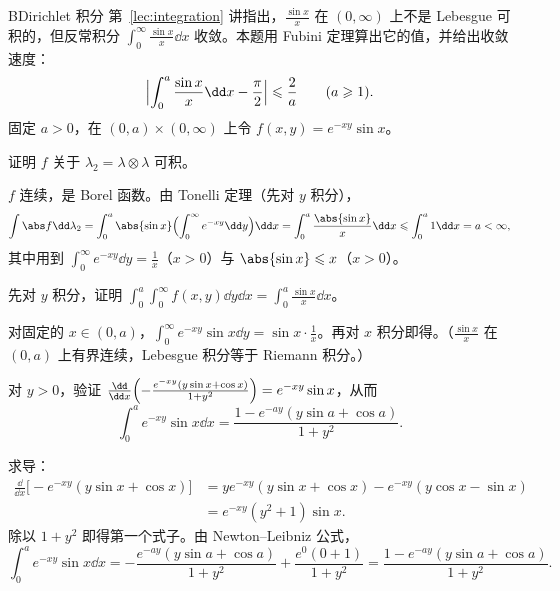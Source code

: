 \begin{probleme}{B}{Dirichlet 积分}
第~\ref{lec:integration} 讲指出，$\frac{\sin x}x$ 在 $(0,\infty)$ 上不是 Lebesgue 可积的，但反常积分 $\int_0^\infty\frac{\sin x}x\dd x$ 收敛。本题用 Fubini 定理算出它的值，并给出收敛速度：
\[
\Bigl\lvert\int_0^a\frac{\sin x}x\dd x-\frac\pi2\Bigr\rvert\leqslant\frac2a\qquad(a\geqslant1).
\]
固定 $a>0$，在 $(0,a)\times(0,\infty)$ 上令 $f(x,y)=e^{-xy}\sin x$。
\begin{questions}
\item 证明 $f$ 关于 $\lambda_2=\lambda\otimes\lambda$ 可积。
\begin{solution}
$f$ 连续，是 Borel 函数。由 Tonelli 定理（先对 $y$ 积分），
\[
\int\abs f\dd\lambda_2=\int_0^a\abs{\sin x}\Bigl(\int_0^\infty e^{-xy}\dd y\Bigr)\dd x=\int_0^a\frac{\abs{\sin x}}x\dd x\leqslant\int_0^a1\dd x=a<\infty,
\]
其中用到 $\int_0^\infty e^{-xy}\dd y=\frac1x$（$x>0$）与 $\abs{\sin x}\leqslant x$（$x>0$）。
\end{solution}

\item 先对 $y$ 积分，证明 $\int_0^a\int_0^\infty f(x,y)\dd y\dd x=\int_0^a\frac{\sin x}x\dd x$。
\begin{solution}
对固定的 $x\in(0,a)$，$\int_0^\infty e^{-xy}\sin x\dd y=\sin x\cdot\frac1x$。再对 $x$ 积分即得。（$\frac{\sin x}x$ 在 $(0,a)$ 上有界连续，Lebesgue 积分等于 Riemann 积分。）
\end{solution}

\item 对 $y>0$，验证 $\frac{\dd}{\dd x}\Bigl(-\frac{e^{-xy}(y\sin x+\cos x)}{1+y^2}\Bigr)=e^{-xy}\sin x$，从而
\[
\int_0^ae^{-xy}\sin x\dd x=\frac{1-e^{-ay}(y\sin a+\cos a)}{1+y^2}.
\]
\begin{solution}
求导：
\[
\begin{aligned}
\frac{\dd}{\dd x}\bigl[-e^{-xy}(y\sin x+\cos x)\bigr]&=ye^{-xy}(y\sin x+\cos x)-e^{-xy}(y\cos x-\sin x)\\
&=e^{-xy}(y^2+1)\sin x .
\end{aligned}
\]
除以 $1+y^2$ 即得第一个式子。由 Newton--Leibniz 公式，
\[
\int_0^ae^{-xy}\sin x\dd x=-\frac{e^{-ay}(y\sin a+\cos a)}{1+y^2}+\frac{e^0(0+1)}{1+y^2}=\frac{1-e^{-ay}(y\sin a+\cos a)}{1+y^2}.
\]
\end{solution}


\end{questions}
\end{probleme}

